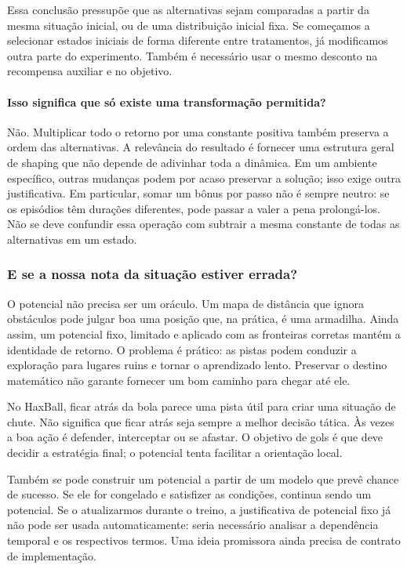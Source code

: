 \documentclass[11pt,a4paper]{article}
\begin{document}
Essa conclusão pressupõe que as alternativas sejam comparadas a partir da mesma situação inicial, ou de uma distribuição inicial fixa. Se começamos a selecionar estados iniciais de forma diferente entre tratamentos, já modificamos outra parte do experimento. Também é necessário usar o mesmo desconto na recompensa auxiliar e no objetivo.

\paragraph{Isso significa que só existe uma transformação permitida?}
Não. Multiplicar todo o retorno por uma constante positiva também preserva a ordem das alternativas. A relevância do resultado é fornecer uma estrutura geral de shaping que não depende de adivinhar toda a dinâmica. Em um ambiente específico, outras mudanças podem por acaso preservar a solução; isso exige outra justificativa. Em particular, somar um bônus por passo não é sempre neutro: se os episódios têm durações diferentes, pode passar a valer a pena prolongá-los. Não se deve confundir essa operação com subtrair a mesma constante de todas as alternativas em um estado.

\subsubsection*{E se a nossa nota da situação estiver errada?}
O potencial não precisa ser um oráculo. Um mapa de distância que ignora obstáculos pode julgar boa uma posição que, na prática, é uma armadilha. Ainda assim, um potencial fixo, limitado e aplicado com as fronteiras corretas mantém a identidade de retorno. O problema é prático: as pistas podem conduzir a exploração para lugares ruins e tornar o aprendizado lento. Preservar o destino matemático não garante fornecer um bom caminho para chegar até ele.

No HaxBall, ficar atrás da bola parece uma pista útil para criar uma situação de chute. Não significa que ficar atrás seja sempre a melhor decisão tática. Às vezes a boa ação é defender, interceptar ou se afastar. O objetivo de gols é que deve decidir a estratégia final; o potencial tenta facilitar a orientação local.

Também se pode construir um potencial a partir de um modelo que prevê chance de sucesso. Se ele for congelado e satisfizer as condições, continua sendo um potencial. Se o atualizarmos durante o treino, a justificativa de potencial fixo já não pode ser usada automaticamente: seria necessário analisar a dependência temporal e os respectivos termos. Uma ideia promissora ainda precisa de contrato de implementação.
\end{document}
